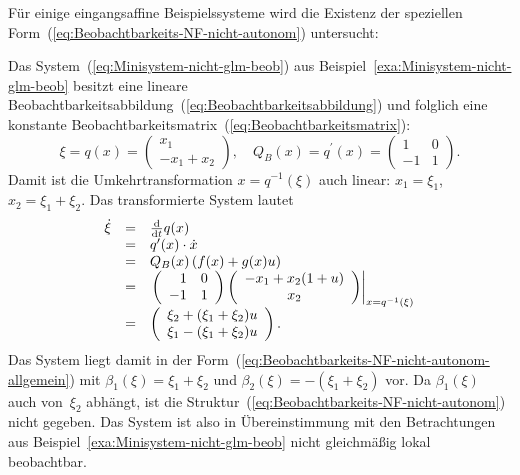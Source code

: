 Für einige eingangsaffine Beispielssysteme wird die Existenz der speziellen
Form~(\ref{eq:Beobachtbarkeits-NF-nicht-autonom}) untersucht:

\begin{example}
\label{exa:Minisystem-nicht-glm-Beobachtbarkeits-NF}Das System~(\ref{eq:Minisystem-nicht-glm-beob})
aus Beispiel~\ref{exa:Minisystem-nicht-glm-beob} besitzt eine lineare
Beobachtbarkeitsabbildung~(\ref{eq:Beobachtbarkeitsabbildung}) und
folglich eine konstante Beobachtbarkeitsmatrix~(\ref{eq:Beobachtbarkeitsmatrix}):
\[
\xi=q(x)=\left(\begin{array}{c}
x_{1}\\
-x_{1}+x_{2}
\end{array}\right),\quad Q_{B}(x)=q^{\prime}(x)=\left(\begin{array}{rc}
1 & 0\\
-1 & 1
\end{array}\right).
\]
Damit ist die Umkehrtransformation $x=q^{-1}(\xi)$ auch linear: $x_{1}=\xi_{1}$,
$x_{2}=\xi_{1}+\xi_{2}$. Das transformierte System lautet
\[
\begin{array}{lcl}
\dot{\xi} & = & \frac{{\mathrm{d}}}{{\mathrm{d}} t}q(x)\\
 & = & q^{\prime}(x)\cdot\dot{x}\\
 & = & Q_{B}(x)\left(f(x)+g(x)u\right)\\
 & = & \left.\left(\begin{array}{rc}
1 & 0\\
-1 & 1
\end{array}\right)\left(\begin{array}{c}
-x_{1}+x_{2}(1+u)\\
x_{2}
\end{array}\right)\right|_{x=q^{-1}(\xi)}\\
 & = & \left(\begin{array}{c}
\xi_{2}+(\xi_{1}+\xi_{2})u\\
\xi_{1}-(\xi_{1}+\xi_{2})u
\end{array}\right).
\end{array}
\]
Das System liegt damit in der Form~(\ref{eq:Beobachtbarkeits-NF-nicht-autonom-allgemein})
mit $\beta_{1}(\xi)=\xi_{1}+\xi_{2}$ und $\beta_{2}(\xi)=-(\xi_{1}+\xi_{2})$
vor. Da $\beta_{1}(\xi)$ auch von~$\xi_{2}$ abhängt, ist die Struktur~(\ref{eq:Beobachtbarkeits-NF-nicht-autonom})
nicht gegeben. Das System ist also in Übereinstimmung mit den Betrachtungen
aus Beispiel~\ref{exa:Minisystem-nicht-glm-beob} nicht gleichmäßig
lokal beobachtbar.
\end{example}

